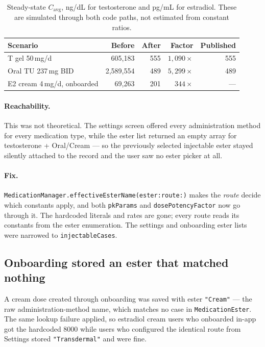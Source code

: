 \documentclass[11pt,a4paper]{article}
\newcommand{\code}[1]{\texttt{\small #1}}
\begin{document}
\begin{table}[h]
\centering
\small
\begin{tabular}{@{}lrrrr@{}}
\toprule
\textbf{Scenario} & \textbf{Before} & \textbf{After} & \textbf{Factor} & \textbf{Published} \\
\midrule
T gel 50\,mg/d & 605{,}183 & 555 & $1{,}090\times$ & 555 \\
Oral TU 237\,mg BID & 2{,}589{,}554 & 489 & $5{,}299\times$ & 489 \\
E2 cream 4\,mg/d, onboarded & 69{,}263 & 201 & $344\times$ & --- \\
\bottomrule
\end{tabular}
\caption{Steady-state $C_{\mathrm{avg}}$, ng/dL for testosterone and pg/mL for
estradiol. These are simulated through both code paths, not estimated from
constant ratios.}
\end{table}

\paragraph{Reachability.} This was not theoretical. The settings screen offered
every administration method for every medication type, while the ester list
returned an empty array for testosterone + Oral\slash\allowbreak Cream --- so the
previously selected injectable ester stayed silently attached to the record and
the user saw no ester picker at all.

\paragraph{Fix.} \code{MedicationManager.effectiveEsterName(ester:route:)} makes
the \emph{route} decide which constants apply, and both \code{pkParams} and
\code{dosePotencyFactor} now go through it. The hardcoded literals and rates are
gone; every route reads its constants from the ester enumeration. The settings
and onboarding ester lists were narrowed to \code{injectableCases}.

\subsection{Onboarding stored an ester that matched nothing}

A cream dose created through onboarding was saved with ester \code{"Cream"} ---
the raw administration-method name, which matches no case in
\code{MedicationEster}. The same lookup failure applied, so estradiol cream users
who onboarded in-app got the hardcoded 8000 while users who configured the
identical route from Settings stored \code{"Transdermal"} and were fine.
\end{document}
